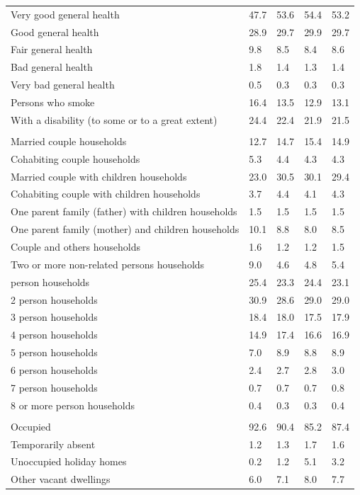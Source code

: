 \documentclass{article}
\begin{document}
\begin{table}[h]
\begin{tabular}{KTTTT}
    \hline
Very good general health & 47.7& 53.6&54.4& 53.2\\
Good general health & 28.9& 29.7& 29.9& 29.7\\
Fair general health & 9.8& 8.5&8.4& 8.6\\
Bad general health & 1.8& 1.4&1.3& 1.4\\
Very bad general health & 0.5& 0.3&0.3& 0.3\\
    \hline
Persons who smoke & 16.4& 13.5&12.9& 13.1\\
    \hline
With a disability (to some or to a great extent) & 24.4& 22.4&21.9& 21.5\\
\hline
    \\ 
    \hline
Married couple households & 12.7& 14.7& 15.4& 14.9\\
Cohabiting couple households & 5.3& 4.4& 4.3& 4.3\\
Married couple with children households & 23.0& 30.5& 30.1& 29.4\\
Cohabiting couple with children households & 3.7& 4.4& 4.1& 4.3\\
One parent family (father) with  children households & 1.5& 1.5& 1.5& 1.5\\
One parent family (mother) and children households & 10.1&  8.8&  8.0&  8.5\\
Couple and others households  & 1.6& 1.2& 1.2& 1.5\\
Two or more non-related persons households & 9.0& 4.6& 4.8& 5.4\\
     person households & 25.4& 23.3& 24.4& 23.1\\
2 person households & 30.9& 28.6& 29.0& 29.0\\
3 person households & 18.4& 18.0& 17.5& 17.9\\
4 person households & 14.9& 17.4& 16.6& 16.9\\
5 person households & 7.0& 8.9& 8.8& 8.9\\
6 person households & 2.4& 2.7& 2.8& 3.0\\
7 person households & 0.7& 0.7& 0.7& 0.8\\
8 or more person households & 0.4& 0.3& 0.3& 0.4\\
\hline
    \\ 
    \hline
Occupied & 92.6& 90.4& 85.2& 87.4\\
Temporarily absent & 1.2& 1.3& 1.7& 1.6\\
Unoccupied holiday homes & 0.2& 1.2& 5.1& 3.2\\
Other vacant dwellings & 6.0& 7.1& 8.0& 7.7\\
\hline
\end{tabular}
\end{table}
\end{document}
